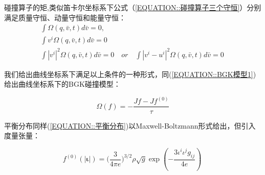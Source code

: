 \documentclass[LBMDerivation.tex]{subfiles}
\begin{document}
碰撞算子的矩,类似笛卡尔坐标系下公式（\ref{EQUATION::碰撞算子三个守恒}）分别满足质量守恒、动量守恒和能量守恒：
\begin{equation}
  \begin{aligned}
    \int  \Omega(q, \bar{v}, t)d \bar{v}=0,      \\
    \int  v^{i} \Omega(q, \bar{v}, t)d \bar{v}=0 \\
    \int|v^i|^2 \Omega(q, \bar{v}, t) d \bar{v} =0 \quad or \quad \int |v^i-u^i|^2 \Omega(q, \bar{v}, t) d \bar{v} =0
  \end{aligned}
  \label{EQUATION::碰撞特性} ~
\end{equation}
%

我们给出曲线坐标系下满足以上条件的一种形式，同(\ref{EQUATION::BGK模型1})给出曲线坐标系下的BGK碰撞模型：

\begin{equation}
  \boxed{
  \Omega(f)= -\frac{Jf-Jf^{(0)}}{\tau}
  }
\end{equation}


平衡分布同样(\ref{EQUATION::平衡分布})以Maxwell-Boltzmann形式给出，但引入度量张量：
%
%

\begin{equation}
  \boxed{
  f^{(0)}(| \boldsymbol{\iota}|) =  {(\frac{3}{4\pi e}})^{3/2}\rho \sqrt{g} \exp({-\frac{3 {\iota^i\iota^jg_{ij}}}{4e}})
  }
  \label{EQUATION::平衡分布2} ~
\end{equation}
\end{document}
